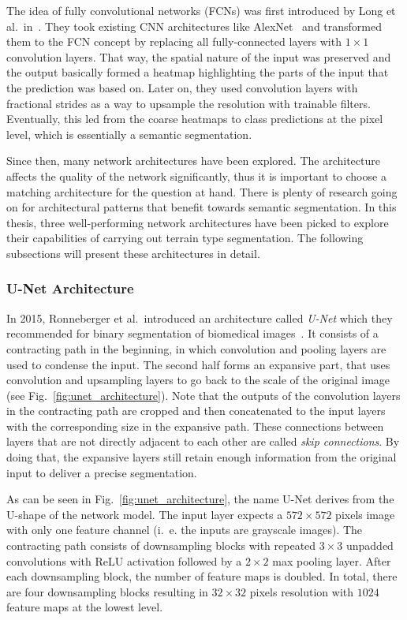 The idea of fully convolutional networks (FCNs) was first introduced by Long et al.\ in~\cite{fcn15}. They took existing CNN architectures like AlexNet~\cite{alexnet12} and transformed them to the FCN concept by replacing all fully-connected layers with $1\times 1$ convolution layers. That way, the spatial nature of the input was preserved and the output basically formed a heatmap highlighting the parts of the input that the prediction was based on. Later on, they used convolution layers with fractional strides as a way to upsample the resolution with trainable filters. Eventually, this led from the coarse heatmaps to class predictions at the pixel level, which is essentially a semantic segmentation.

Since then, many network architectures have been explored. The architecture affects the quality of the network significantly, thus it is important to choose a matching architecture for the question at hand. There is plenty of research going on for architectural patterns that benefit towards semantic segmentation. In this thesis, three well-performing network architectures have been picked to explore their capabilities of carrying out terrain type segmentation. The following subsections will present these architectures in detail.

\subsubsection{U-Net Architecture}
\label{sec:unet}
In 2015, Ronneberger et al.\ introduced an architecture called \emph{U-Net} which they recommended for binary segmentation of biomedical images~\cite{unet15}. It consists of a contracting path in the beginning, in which convolution and pooling layers are used to condense the input. The second half forms an expansive part, that uses convolution and upsampling layers to go back to the scale of the original image (see Fig.~\ref{fig:unet_architecture}). Note that the outputs of the convolution layers in the contracting path are cropped and then concatenated to the input layers with the corresponding size in the expansive path. These connections between layers that are not directly adjacent to each other are called \emph{skip connections}. By doing that, the expansive layers still retain enough information from the original input to deliver a precise segmentation.

As can be seen in Fig.~\ref{fig:unet_architecture}, the name U-Net derives from the U-shape of the network model. The input layer expects a $572\times 572$ pixels image with only one feature channel (i.~e. the inputs are grayscale images). The contracting path consists of downsampling blocks with repeated $3\times 3$ unpadded convolutions with ReLU activation followed by a $2\times 2$ max pooling layer. After each downsampling block, the number of feature maps is doubled. In total, there are four downsampling blocks resulting in $32\times 32$ pixels resolution with $1024$ feature maps at the lowest level.

